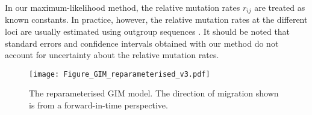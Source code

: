\documentclass[11pt]{article}
\begin{document}
In our maximum-likelihood method, the relative mutation rates $r_{ij}$ are treated as known constants. In practice, however,
the relative mutation rates at the different loci are usually estimated using outgroup sequences
\citep[for example,][]{Yang2002, Wang2010, Lohse2011, Costa2017}. 
It should be noted that standard errors and confidence intervals obtained with our method do not account for uncertainty about the relative mutation rates.

\begin{figure}[!b]
\hspace*{3.25cm}
\texttt{[image: Figure\_GIM\_reparameterised\_v3.pdf]}
\vspace*{-2.9cm}
\caption{The reparameterised GIM model. The direction of migration shown is from a forward-in-time perspective.}
\label{GIM_reparameterised}
\end{figure}
\end{document}
